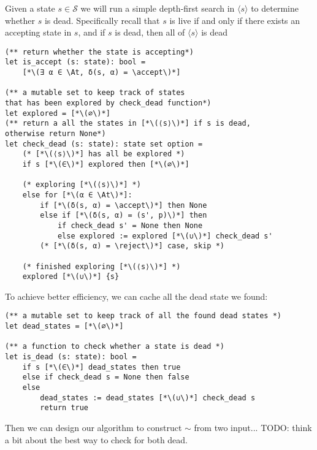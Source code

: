 \documentclass[acmsmall,screen]{acmart}
\newcommand{\At}{\mathbf{At}}
\newcommand{\reject}{\mathinner{\mathtt{Reject}}}
\newcommand{\accept}{\mathinner{\mathtt{Accept}}}
\newcommand{\theoryOf}[1]{\ensuremath{\mathsf{#1}}}
\newcommand{\BExp}{\theoryOf{BExp}}
\begin{document}
Given a state \(s ∈ 𝒮\) we will run a simple depth-first search in \(⟨s⟩\) to determine whether \(s\) is dead. Specifically recall that \(s\) is live if and only if there exists an accepting state in \(s\), and if \(s\) is dead, then all of \(⟨s⟩\) is dead
\begin{lstlisting}
(** return whether the state is accepting*)
let is_accept (s: state): bool = 
    [*\(∃ α ∈ \At, δ(s, α) = \accept\)*]

(** a mutable set to keep track of states 
that has been explored by check_dead function*)
let explored = [*\(∅\)*]
(** return a all the states in [*\(⟨s⟩\)*] if s is dead, 
otherwise return None*)
let check_dead (s: state): state set option =
    (* [*\(⟨s⟩\)*] has all be explored *)
    if s [*\(∈\)*] explored then [*\(∅\)*]

    (* exploring [*\(⟨s⟩\)*] *)
    else for [*\(α ∈ \At\)*]:
        if [*\(δ(s, α) = \accept\)*] then None 
        else if [*\(δ(s, α) = (s', p)\)*] then 
            if check_dead s' = None then None 
            else explored := explored [*\(∪\)*] check_dead s'
        (* [*\(δ(s, α) = \reject\)*] case, skip *)

    (* finished exploring [*\(⟨s⟩\)*] *)
    explored [*\(∪\)*] {s}
\end{lstlisting}
To achieve better efficiency, we can cache all the dead state we found:
\begin{lstlisting}
(** a mutable set to keep track of all the found dead states *)
let dead_states = [*\(∅\)*]

(** a function to check whether a state is dead *)
let is_dead (s: state): bool =
    if s [*\(∈\)*] dead_states then true 
    else if check_dead s = None then false 
    else 
        dead_states := dead_states [*\(∪\)*] check_dead s
        return true
\end{lstlisting}
Then we can design our algorithm to construct \(∼\) from two input...  
TODO: think a bit about the best way to check for both dead.



\end{document}
